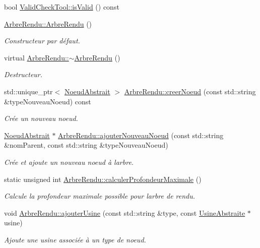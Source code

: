 \begin{DoxyCompactItemize}
\item 
bool \hyperlink{group__inf2990_ga8917a37ee52e2661d510c79a43a4032d}{Valid\+Check\+Tool\+::is\+Valid} () const 
\item 
\hyperlink{group__inf2990_gaef1e98a66c4f1d3b468c786edee45ae6}{Arbre\+Rendu\+::\+Arbre\+Rendu} ()
\begin{DoxyCompactList}\small\item\em Constructeur par défaut. \end{DoxyCompactList}\item 
virtual \hyperlink{group__inf2990_gadb462923759da0ff632dad097b7bfdab}{Arbre\+Rendu\+::$\sim$\+Arbre\+Rendu} ()
\begin{DoxyCompactList}\small\item\em Destructeur. \end{DoxyCompactList}\item 
std\+::unique\+\_\+ptr$<$ \hyperlink{class_noeud_abstrait}{Noeud\+Abstrait} $>$ \hyperlink{group__inf2990_gaead1f3ae9de5de53e31ad9e886ba259c}{Arbre\+Rendu\+::creer\+Noeud} (const std\+::string \&type\+Nouveau\+Noeud) const 
\begin{DoxyCompactList}\small\item\em Crée un nouveau noeud. \end{DoxyCompactList}\item 
\hyperlink{class_noeud_abstrait}{Noeud\+Abstrait} $\ast$ \hyperlink{group__inf2990_gac10e5f0623af502d67f72aef764206a3}{Arbre\+Rendu\+::ajouter\+Nouveau\+Noeud} (const std\+::string \&nom\+Parent, const std\+::string \&type\+Nouveau\+Noeud)
\begin{DoxyCompactList}\small\item\em Crée et ajoute un nouveau noeud à l\textquotesingle{}arbre. \end{DoxyCompactList}\item 
static unsigned int \hyperlink{group__inf2990_gacf0e53d52040b07cd6550fda79867bd5}{Arbre\+Rendu\+::calculer\+Profondeur\+Maximale} ()
\begin{DoxyCompactList}\small\item\em Calcule la profondeur maximale possible pour l\textquotesingle{}arbre de rendu. \end{DoxyCompactList}\item 
void \hyperlink{group__inf2990_ga296a744837fb7b779fadf2e8c62e6577}{Arbre\+Rendu\+::ajouter\+Usine} (const std\+::string \&type, const \hyperlink{class_usine_abstraite}{Usine\+Abstraite} $\ast$usine)
\begin{DoxyCompactList}\small\item\em Ajoute une usine associée à un type de noeud. \end{DoxyCompactList}\item 

\end{DoxyCompactItemize}
